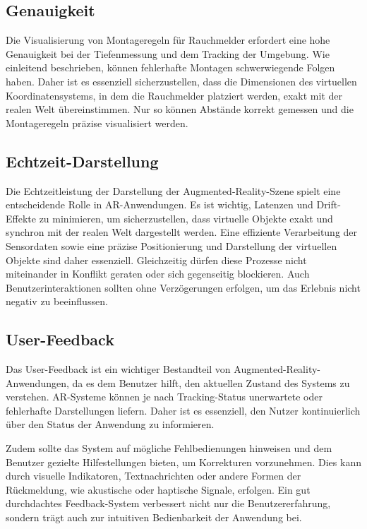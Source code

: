 \subsection{Genauigkeit}

Die Visualisierung von Montageregeln für Rauchmelder erfordert eine hohe Genauigkeit bei der Tiefenmessung und dem Tracking der Umgebung. Wie einleitend beschrieben, können fehlerhafte Montagen schwerwiegende Folgen haben. Daher ist es essenziell sicherzustellen, dass die Dimensionen des virtuellen Koordinatensystems, in dem die Rauchmelder platziert werden, exakt mit der realen Welt übereinstimmen. Nur so können Abstände korrekt gemessen und die Montageregeln präzise visualisiert werden.

\subsection{Echtzeit-Darstellung}

Die Echtzeitleistung der Darstellung der Augmented-Reality-Szene spielt eine entscheidende Rolle in AR-Anwendungen. Es ist wichtig, Latenzen und Drift-Effekte zu minimieren, um sicherzustellen, dass virtuelle Objekte exakt und synchron mit der realen Welt dargestellt werden. Eine effiziente Verarbeitung der Sensordaten sowie eine präzise Positionierung und Darstellung der virtuellen Objekte sind daher essenziell. Gleichzeitig dürfen diese Prozesse nicht miteinander in Konflikt geraten oder sich gegenseitig blockieren. Auch Benutzerinteraktionen sollten ohne Verzögerungen erfolgen, um das Erlebnis nicht negativ zu beeinflussen.

\subsection{User-Feedback}

Das User-Feedback ist ein wichtiger Bestandteil von Augmented-Reality-Anwendungen, da es dem Benutzer hilft, den aktuellen Zustand des Systems zu verstehen. AR-Systeme können je nach Tracking-Status unerwartete oder fehlerhafte Darstellungen liefern. Daher ist es essenziell, den Nutzer kontinuierlich über den Status der Anwendung zu informieren.

Zudem sollte das System auf mögliche Fehlbedienungen hinweisen und dem Benutzer gezielte Hilfestellungen bieten, um Korrekturen vorzunehmen. Dies kann durch visuelle Indikatoren, Textnachrichten oder andere Formen der Rückmeldung, wie akustische oder haptische Signale, erfolgen. Ein gut durchdachtes Feedback-System verbessert nicht nur die Benutzererfahrung, sondern trägt auch zur intuitiven Bedienbarkeit der Anwendung bei.

